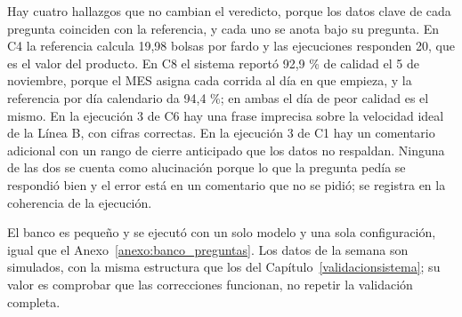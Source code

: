 \begin{singlespace}
Hay cuatro hallazgos que no cambian el veredicto, porque los datos clave de cada pregunta coinciden con la referencia, y cada uno se anota bajo su pregunta. En C4 la referencia calcula 19,98 bolsas por fardo y las ejecuciones responden 20, que es el valor del producto. En C8 el sistema reportó 92,9 \% de calidad el 5 de noviembre, porque el MES asigna cada corrida al día en que empieza, y la referencia por día calendario da 94,4 \%; en ambas el día de peor calidad es el mismo. En la ejecución 3 de C6 hay una frase imprecisa sobre la velocidad ideal de la Línea B, con cifras correctas. En la ejecución 3 de C1 hay un comentario adicional con un rango de cierre anticipado que los datos no respaldan. Ninguna de las dos se cuenta como alucinación porque lo que la pregunta pedía se respondió bien y el error está en un comentario que no se pidió; se registra en la coherencia de la ejecución.

El banco es pequeño y se ejecutó con un solo modelo y una sola configuración, igual que el Anexo~\ref{anexo:banco_preguntas}. Los datos de la semana son simulados, con la misma estructura que los del Capítulo~\ref{validacionsistema}; su valor es comprobar que las correcciones funcionan, no repetir la validación completa.


\end{singlespace}
